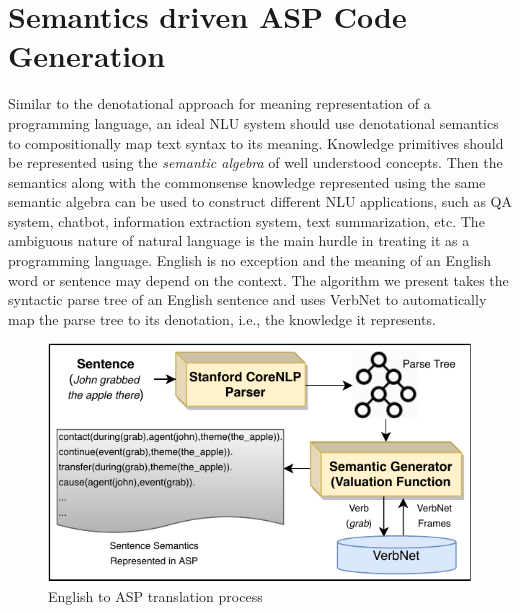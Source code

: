\documentclass[letterpaper]{article}
\begin{document}
\section{Semantics driven ASP Code Generation}
Similar to the denotational approach for meaning representation of a programming language, an ideal NLU system should use denotational semantics to compositionally map text syntax to its meaning. Knowledge primitives should be represented using the \textit{semantic algebra} \cite{d_semantics} of  well understood concepts. Then the semantics along with the commonsense knowledge represented using the same semantic algebra can be used to construct different NLU applications, such as QA system, chatbot, information extraction system, text summarization, etc. The ambiguous nature of natural language is the main hurdle in treating it as a programming language. English is no exception and the meaning of an English word or sentence may depend on the context. The algorithm we present takes the syntactic parse tree of an English sentence and uses VerbNet to automatically map the parse tree to its denotation, i.e., the knowledge it represents.




\begin{figure}[h]
    \centering
    \includegraphics[scale = 0.8]{semantic_algebra}
    \caption{English to ASP translation process }
    \label{fig:semantic_algebra}
    \end{figure}
\end{document}
